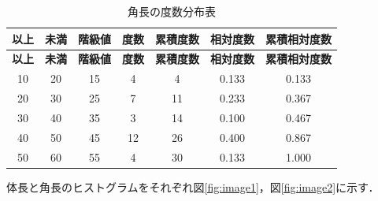 \documentclass[titlepage,a4paper]{jsarticle}
\begin{document}
\begin{longtable}{|c|c|c|c|c|c|c|}
  \caption{角長の度数分布表} \label{tab:frequency2}                                                                \\
  \hline
  \textbf{以上} & \textbf{未満} & \textbf{階級値} & \textbf{度数} & \textbf{累積度数} & \textbf{相対度数} & \textbf{累積相対度数} \\ \hline
  \endfirsthead
  \hline
  \textbf{以上} & \textbf{未満} & \textbf{階級値} & \textbf{度数} & \textbf{累積度数} & \textbf{相対度数} & \textbf{累積相対度数} \\ \hline
  \endhead
  10          & 20          & 15           & 4           & 4             & 0.133         & 0.133           \\ \hline
  20          & 30          & 25           & 7           & 11            & 0.233         & 0.367           \\ \hline
  30          & 40          & 35           & 3           & 14            & 0.100         & 0.467           \\ \hline
  40          & 50          & 45           & 12          & 26            & 0.400         & 0.867           \\ \hline
  50          & 60          & 55           & 4           & 30            & 0.133         & 1.000           \\ \hline
\end{longtable}
体長と角長のヒストグラムをそれぞれ図\ref{fig:image1}，図\ref{fig:image2}に示す．
\end{document}
